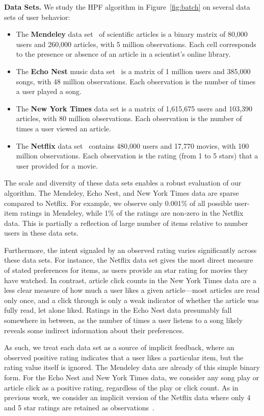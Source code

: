 {\bf Data Sets.} We study the HPF algorithm in Figure~\ref{fig:batch}
on several data sets of user behavior:
\begin{itemize}
\item The {\bf Mendeley} data set~\cite{Jack:2010} of scientific
  articles is a binary matrix of 80,000 users and 260,000 articles,
  with 5 million observations.  Each cell corresponds to the presence
  or absence of an article in a scientist's online library.
\item The {\bf Echo Nest} music data set~\cite{Bertin-Mahieux:2011} is
  a matrix of 1 million users and 385,000 songs, with 48 million
  observations.  Each observation is the number of times a user played
  a song.
\item The {\bf New York Times} data set is a matrix of 1,615,675 users
  and 103,390 articles, with 80 million observations.  Each
  observation is the number of times a user viewed an article.

\item The {\bf Netflix} data set~\cite{Koren:2009} contains 480,000
  users and 17,770 movies, with 100 million observations. Each
  observation is the rating (from 1 to 5 stars) that a user provided
  for a movie.
\end{itemize}

The scale and diversity of these data sets enables a robust evaluation
of our algorithm. The Mendeley, Echo Nest, and New York Times data
are sparse compared to Netflix. For example, we observe
only 0.001\% of all possible user-item ratings in Mendeley, while 1\%
of the ratings are non-zero in the Netflix data. This is partially a
reflection of large number of items relative to number users in these
data sets.

Furthermore, the intent signaled by an observed rating varies
significantly across these data sets. For instance, the Netflix data
set gives the most direct measure of stated preferences for items, as
users provide an star rating for movies they have watched. In
contrast, article click counts in the New York Times data are a less
clear measure of how much a user likes a given article---most articles
are read only once, and a click through is only a weak indicator of
whether the article was fully read, let alone liked. Ratings in the
Echo Nest data presumably fall somewhere in between, as the number of
times a user listens to a song likely reveals some indirect
information about their preferences.

As such, we treat each data set as a source of implicit feedback,
where an observed positive rating indicates that a user likes a
particular item, but the rating value itself is ignored. The Mendeley
data are already of this simple binary form. For the Echo Nest and New
York Times data, we consider any song play or article click as a
positive rating, regardless of the play or click count. As in previous
work, we consider an implicit version of the Netflix data where only 4
and 5 star ratings are retained as
observations~\cite{Paquet:2013p9197}.

